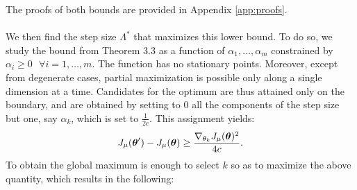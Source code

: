 The proofs of both bounds are provided in Appendix \ref{app:proofs}.
\paragraph{}
We then find the step size $\Lambda^*$ that maximizes this lower bound. To do so, we study the bound from Theorem 3.3 as a function of $\alpha_1,\dotsc,\alpha_m$ constrained by $\alpha_i \geq 0 \:\:\: \forall i=1,\dotsc,m$. The function has no stationary points. Moreover, except from degenerate cases, partial maximization is possible only along a single dimension at a time. Candidates for the optimum are thus attained only on the boundary, and are obtained by setting to $0$ all the components of the step size but one, say $\alpha_k$, which is set to $\frac{1}{2c}$.
This assignment yields:
\[
J_{\mu}(\boldsymbol{\theta}') - J_{\mu}(\boldsymbol{\theta}) \geq  \frac{\nabla_{\theta_k}J_\mu(\boldsymbol{\theta})^2}{4c}.
\]
To obtain the global maximum is enough to select $k$ so as to maximize the above quantity, which results in the following:

